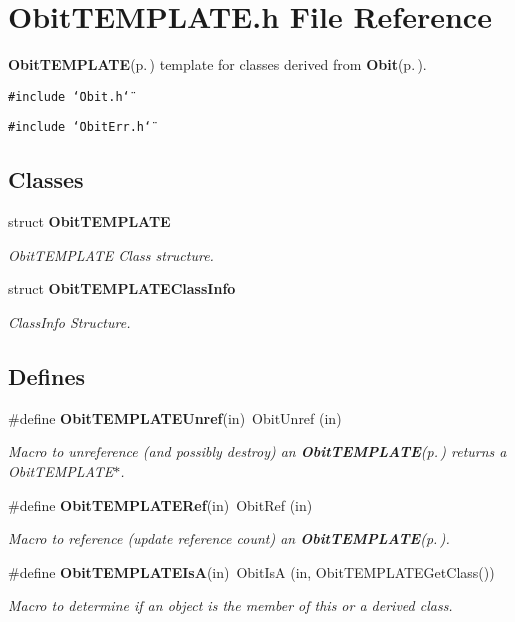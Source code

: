 \section{Obit\-TEMPLATE.h File Reference}
\label{ObitTEMPLATE_8h}
{\bf Obit\-TEMPLATE}{\rm (p.\,\pageref{structObitTEMPLATE})} template for classes derived from {\bf Obit}{\rm (p.\,\pageref{structObit})}. 

{\tt \#include \char`\"{}Obit.h\char`\"{}}\par
{\tt \#include \char`\"{}Obit\-Err.h\char`\"{}}\par
\subsection*{Classes}
\begin{CompactItemize}
\item 
struct {\bf Obit\-TEMPLATE}
\begin{CompactList}\small\item\em Obit\-TEMPLATE Class structure. \item\end{CompactList}\item 
struct {\bf Obit\-TEMPLATEClass\-Info}
\begin{CompactList}\small\item\em Class\-Info Structure. \item\end{CompactList}\end{CompactItemize}
\subsection*{Defines}
\begin{CompactItemize}
\item 
\#define {\bf Obit\-TEMPLATEUnref}(in)\ Obit\-Unref (in)
\begin{CompactList}\small\item\em Macro to unreference (and possibly destroy) an {\bf Obit\-TEMPLATE}{\rm (p.\,\pageref{structObitTEMPLATE})} returns a Obit\-TEMPLATE$\ast$. \item\end{CompactList}\item 
\#define {\bf Obit\-TEMPLATERef}(in)\ Obit\-Ref (in)
\begin{CompactList}\small\item\em Macro to reference (update reference count) an {\bf Obit\-TEMPLATE}{\rm (p.\,\pageref{structObitTEMPLATE})}. \item\end{CompactList}\item 
\#define {\bf Obit\-TEMPLATEIs\-A}(in)\ Obit\-Is\-A (in, Obit\-TEMPLATEGet\-Class())
\begin{CompactList}\small\item\em Macro to determine if an object is the member of this or a derived class. \item\end{CompactList}\end{CompactItemize}
